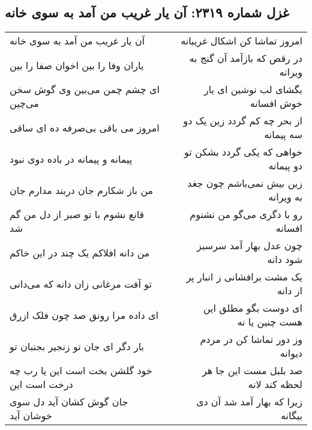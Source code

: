\begin{center}
\section*{غزل شماره ۲۳۱۹: آن یار غریب من آمد به سوی خانه}
\label{sec:2319}
\begin{longtable}{l p{0.5cm} r}
آن یار غریب من آمد به سوی خانه
&&
امروز تماشا کن اشکال غریبانه
\\
یاران وفا را بین اخوان صفا را بین
&&
در رقص که بازآمد آن گنج به ویرانه
\\
ای چشم چمن می‌بین وی گوش سخن می‌چین
&&
بگشای لب نوشین ای یار خوش افسانه
\\
امروز می باقی بی‌صرفه ده ای ساقی
&&
از بحر چه کم گردد زین یک دو سه پیمانه
\\
پیمانه و پیمانه در باده دوی نبود
&&
خواهی که یکی گردد بشکن تو دو پیمانه
\\
من باز شکارم جان دربند مدارم جان
&&
زین بیش نمی‌باشم چون جغد به ویرانه
\\
قانع نشوم با تو صبر از دل من گم شد
&&
رو با دگری می‌گو من نشنوم افسانه
\\
من دانه افلاکم یک چند در این خاکم
&&
چون عدل بهار آمد سرسبز شود دانه
\\
تو آفت مرغانی زان دانه که می‌دانی
&&
یک مشت برافشانی ز انبار پر از دانه
\\
ای داده مرا رونق صد چون فلک ازرق
&&
ای دوست بگو مطلق این هست چنین یا نه
\\
بار دگر ای جان تو زنجیر بجنبان تو
&&
وز دور تماشا کن در مردم دیوانه
\\
خود گلشن بخت است این یا رب چه درخت است این
&&
صد بلبل مست این جا هر لحظه کند لانه
\\
جان گوش کشان آید دل سوی خوشان آید
&&
زیرا که بهار آمد شد آن دی بیگانه
\\
\end{longtable}
\end{center}
